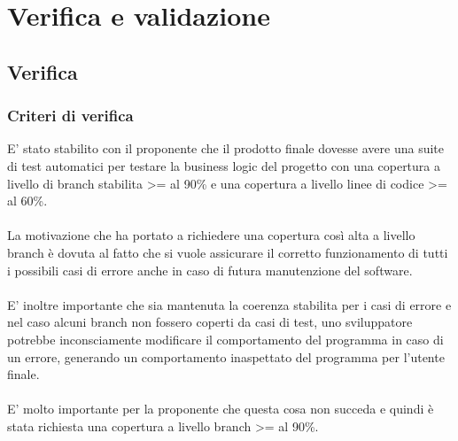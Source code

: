 
\chapter{Verifica e validazione}
\label{cap:verifica-e-validazione}

\section{Verifica}
\subsection{Criteri di verifica}
E' stato stabilito con il proponente che il prodotto finale dovesse avere 
una suite di test automatici per testare la business logic del progetto
con una copertura a livello di branch stabilita >= al 90\% e una copertura
a livello linee di codice >= al 60\%.
\\\\
La motivazione che ha portato a richiedere una copertura così alta a livello
branch è dovuta al fatto che si vuole assicurare il corretto funzionamento di 
tutti i possibili casi di errore anche in caso di futura manutenzione del software.
\\\\
E' inoltre importante che sia mantenuta la coerenza stabilita per i casi di errore e
nel caso alcuni branch non fossero coperti da casi di test, uno sviluppatore potrebbe
inconsciamente modificare il comportamento del programma in caso di un errore, generando
un comportamento inaspettato del programma per l'utente finale. 
\\\\
E' molto importante per la proponente che questa cosa non succeda e quindi è stata richiesta
una copertura a livello branch >= al 90\%.

